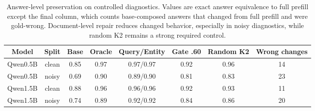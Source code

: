 \begin{table}[t]
\centering
\footnotesize
\begin{adjustbox}{max width=\textwidth}
\begin{tabular}{cccccccc}
\toprule
Model & Split & Base & Oracle & Query/Entity & Gate .60 & Random K2 & Wrong changes \\
\midrule
Qwen0.5B & clean & 0.85 & 0.97 & 0.97/0.97 & 0.92 & 0.96 & 14 \\
Qwen0.5B & noisy & 0.69 & 0.90 & 0.89/0.90 & 0.81 & 0.83 & 23 \\
Qwen1.5B & clean & 0.88 & 0.96 & 0.96/0.96 & 0.92 & 0.93 & 11 \\
Qwen1.5B & noisy & 0.74 & 0.89 & 0.92/0.92 & 0.84 & 0.86 & 20 \\
\bottomrule
\end{tabular}
\end{adjustbox}
\caption{Answer-level preservation on controlled diagnostics. Values are exact answer equivalence to full prefill except the final column, which counts base-composed answers that changed from full prefill and were gold-wrong. Document-level repair reduces changed behavior, especially in noisy diagnostics, while random K2 remains a strong required control.}
\label{tab:answer-summary}
\end{table}
